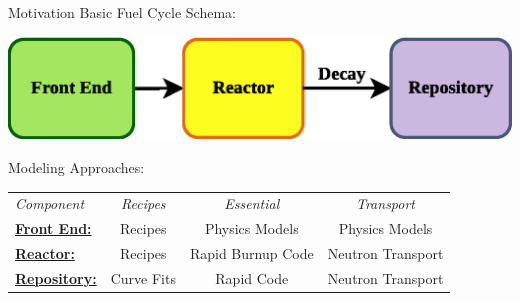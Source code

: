 \documentclass[pdf, autumn, slideColor, nocolorBG]{prosper}
\begin{document}
\begin{slide}{Motivation}
\small Basic Fuel Cycle Schema:
\begin{center}
\includegraphics[scale=0.5]{figs/basic_nfc_schema.eps}
\end{center}

Modeling Approaches: \small
\begin{center}
\begin{tabular}{lccc}
\textit{Component}                  & \textit{Recipes}  & \textit{Essential} & \textit{Transport}   \\
\underline{\textbf{Front End:}}     & Recipes           & Physics Models     & Physics Models       \\
\underline{\textbf{Reactor:}}       & Recipes           & Rapid Burnup Code  & Neutron Transport    \\
\underline{\textbf{Repository:}}    & Curve Fits        & Rapid Code         & Neutron Transport    \\
\end{tabular}
\end{center}
\end{slide}
\end{document}
